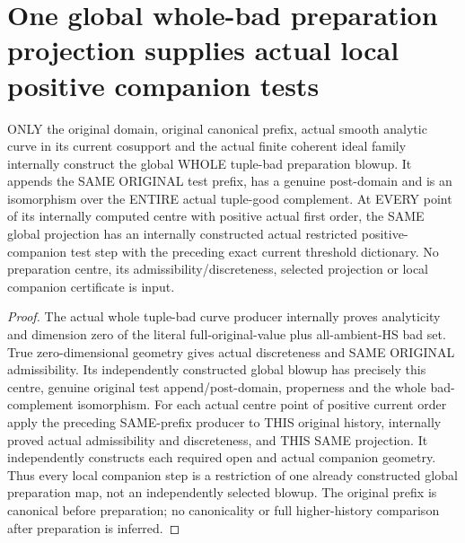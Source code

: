\section{One global whole-bad preparation projection supplies actual local positive companion tests}

\begin{theorem}
\label{hir:original-curve-tuple-preparation-internal-positive-companion-steps}
\leanok
ONLY the original domain, original canonical prefix, actual smooth analytic
curve in its current cosupport and the actual finite coherent ideal family
internally construct the global WHOLE tuple-bad preparation blowup. It
appends the SAME ORIGINAL test prefix, has a genuine post-domain and is
an isomorphism over the ENTIRE actual tuple-good complement. At EVERY
point of its internally computed centre with positive actual first order,
the SAME global projection has an internally constructed actual restricted
positive-companion test step with the preceding exact current threshold
dictionary. No preparation centre, its admissibility/discreteness, selected
projection or local companion certificate is input.
\end{theorem}
\begin{proof}
The actual whole tuple-bad curve producer internally proves analyticity
and dimension zero of the literal full-original-value plus all-ambient-HS
bad set. True zero-dimensional geometry gives actual discreteness and
SAME ORIGINAL admissibility. Its independently constructed global blowup
has precisely this centre, genuine original test append/post-domain,
properness and the whole bad-complement isomorphism. For each actual
centre point of positive current order apply the preceding SAME-prefix
producer to THIS original history, internally proved actual admissibility
and discreteness, and THIS SAME projection. It independently constructs
each required open and actual companion geometry. Thus every local
companion step is a restriction of one already constructed global
preparation map, not an independently selected blowup. The original prefix
is canonical before preparation; no canonicality or full higher-history
comparison after preparation is inferred.
\end{proof}
